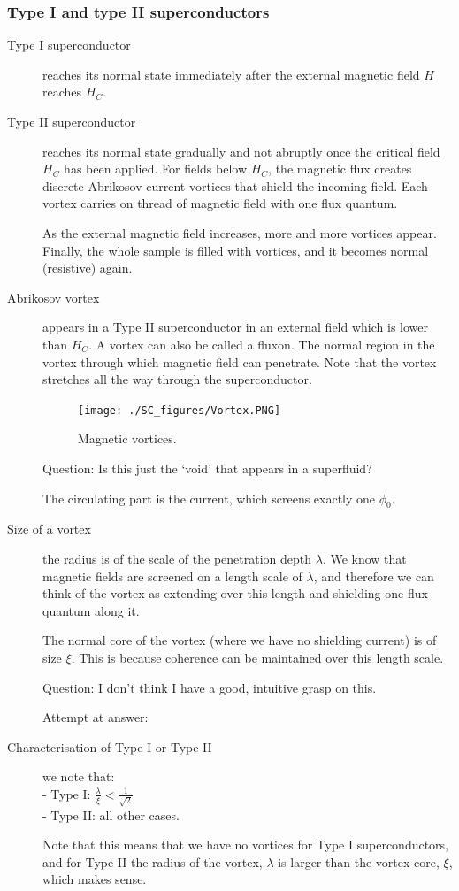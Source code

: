 \subsubsection{Type I and type II superconductors}
\begin{description}
\item[Type I superconductor] reaches its normal state immediately after the external magnetic field $H$ reaches $H_C$. 

\item[Type II superconductor] reaches its normal state gradually and not abruptly once the critical field $H_C$ has been applied. For fields below $H_C$, the magnetic flux creates discrete Abrikosov current vortices that shield the incoming field. Each vortex carries on thread of magnetic field with one flux quantum. 

As the external magnetic field increases, more and more vortices appear. Finally, the whole sample is filled with vortices, and it becomes normal (resistive) again. 

\item[Abrikosov vortex] appears in a Type II superconductor in an external field which is lower than $H_C$. A vortex can also be called a fluxon. The normal region in the vortex through which magnetic field can penetrate. Note that the vortex stretches all the way through the superconductor. 


\begin{figure}[h]
  \caption{Magnetic vortices.}
  \centering
    \texttt{[image: ./SC\_figures/Vortex.PNG]}
\end{figure}


Question: Is this just the `void' that appears in a superfluid? 

The circulating part is the current, which screens exactly one $\phi_0$. 

\item[Size of a vortex] the radius is of the scale of the penetration depth $\lambda$. We know that magnetic fields are screened on a length scale of $\lambda$, and therefore we can think of the vortex as extending over this length and shielding one flux quantum along it. 

The normal core of the vortex (where we have no shielding current) is of size $\xi$. This is because coherence can be maintained over this length scale. 

Question: I don't think I have a good, intuitive grasp on this. 

Attempt at answer: 

\item[Characterisation of Type I or Type II] we note that: \\ 
- Type I: $\frac{\lambda}{\xi} < \frac{1}{\sqrt{2}}$ \\
- Type II: all other cases. 

Note that this means that we have no vortices for Type I superconductors, and for Type II the radius of the vortex, $\lambda$ is larger than the vortex core, $\xi$, which makes sense. 

\end{description}

